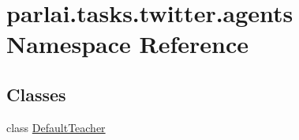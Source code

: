 \hypertarget{namespaceparlai_1_1tasks_1_1twitter_1_1agents}{}\section{parlai.\+tasks.\+twitter.\+agents Namespace Reference}
\label{namespaceparlai_1_1tasks_1_1twitter_1_1agents}
\subsection*{Classes}
\begin{DoxyCompactItemize}
\item 
class \hyperlink{classparlai_1_1tasks_1_1twitter_1_1agents_1_1DefaultTeacher}{Default\+Teacher}
\end{DoxyCompactItemize}
